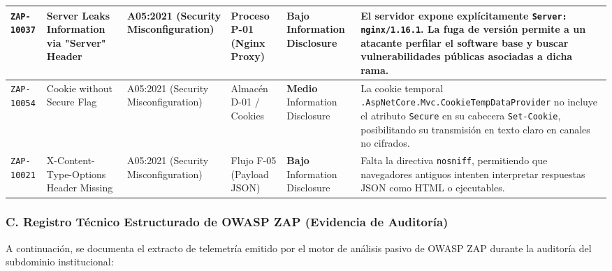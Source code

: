 \begin{longtable}{p{1.5cm} p{2.4cm} p{2.1cm} p{1.8cm} >{\centering\arraybackslash}p{1.6cm} p{4.2cm}}
\texttt{ZAP-10037} & Server Leaks Information via "Server" Header & A05:2021 (Security Misconfiguration) & Proceso P-01 (Nginx Proxy) & \textbf{Bajo} \newline Information Disclosure & El servidor expone explícitamente \texttt{Server: nginx/1.16.1}. La fuga de versión permite a un atacante perfilar el software base y buscar vulnerabilidades públicas asociadas a dicha rama. \\ \midrule
\texttt{ZAP-10054} & Cookie without Secure Flag & A05:2021 (Security Misconfiguration) & Almacén D-01 / Cookies & \textbf{Medio} \newline Information Disclosure & La cookie temporal \texttt{.AspNetCore.\allowbreak Mvc.\allowbreak CookieTemp\allowbreak DataProvider} no incluye el atributo \texttt{Secure} en su cabecera \texttt{Set-Cookie}, posibilitando su transmisión en texto claro en canales no cifrados. \\ \midrule
\texttt{ZAP-10021} & X-Content-Type-Options Header Missing & A05:2021 (Security Misconfiguration) & Flujo F-05 (Payload JSON) & \textbf{Bajo} \newline Information Disclosure & Falta la directiva \texttt{nosniff}, permitiendo que navegadores antiguos intenten interpretar respuestas JSON como HTML o ejecutables. \\
\bottomrule
\end{longtable}
\endgroup

\subsubsection{C. Registro Técnico Estructurado de OWASP ZAP (Evidencia de Auditoría)}
A continuación, se documenta el extracto de telemetría emitido por el motor de análisis pasivo de OWASP ZAP durante la auditoría del subdominio institucional:

